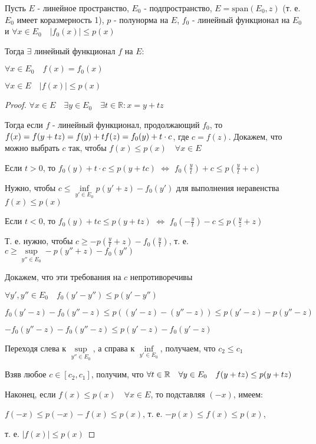 \documentclass[a4paper,12pt]{report}
\newcommand*{\hm}[1]{#1\nobreak\discretionary{}%
            {\hbox{$\mathsurround=0pt #1$}}{}}
\begin{document}
\begin{lem} Пусть $E$ - линейное пространство, $E_0$ - подпространство, $E=\mathrm{span}(E_0,z)$ (т. е. $E_0$ имеет коразмерность 1), $p$ - полунорма на $E$, $f_0$ - линейный функционал на $E_0$ и $\forall x\in E_0\quad|f_0(x)|\le p(x)$

Тогда $\exists$ линейный функционал $f$ на $E\colon$

$\forall x\in E_0\quad f(x)=f_0(x)$

$\forall x\in E\quad|f(x)|\le p(x)$
\end{lem}
\begin{proof} $\forall x\in E\quad\exists y\in E_0\quad\exists t\in\mathbb R\colon x=y+tz$

Тогда если $f$ - линейный функционал, продолжающий $f_0$, то $f(x)\hm=f(y+tz)=f(y)+tf(z)=f_0(y)+t\cdot c$, где $c=f(z)$. Докажем, что можно выбрать $c$ так, чтобы $f(x)\le p(x)\quad\forall x\in E$

Если $t>0$, то $f_0(y)+t\cdot c\le p(y+tc)$ $\Leftrightarrow$ $f_0(\frac{y}{t})+c\le p(\frac{y}{t}+c)$

Нужно, чтобы $c\le\inf\limits_{y'\in E_0}p(y'+z)-f_0(y')$ для выполнения неравенства $f(x)\le p(x)$

Если $t<0$, то $f_0(y)+tc\le p(y+tz)$ $\Leftrightarrow$ $f_0(-\frac{y}{t})-c\le p(\frac{y}{z}+z)$

Т. е. нужно, чтобы $c\ge-p(\frac{y}{t}+z)-f_0(\frac{y}{t})$, т. е. $c\ge\sup\limits_{y''\in E_0}-p(y''+z)-f_0(y'')$

Докажем, что эти требования на $c$ непротиворечивы

$\forall y',y''\in E_0\quad f_0(y'-y'')\le p(y'-y'')$

$f_0(y'-z)-f_0(y''-z)\le p((y'-z)-(y''-z))\le p(y'-z)-p(y''-z)$

$-f_0(y''-z)-f_0(y''-z)\le p(y'-z)-f_0(y'-z)$

Переходя слева к $\sup\limits_{y''\in E_0}$, а справа к $\inf\limits_{y'\in E_0}$, получаем, что $c_2\le c_1$

Взяв любое $c\in[c_2,c_1]$, получим, что $\forall t\in\mathbb R\quad\forall y\in E_0\quad f(y+tz)\hm\le p(y+tz)$

Наконец, если $f(x)\le p(x)\quad\forall x\in E$, то подставляя $(-x)$, имеем:

$f(-x)\le p(-x)-f(x)\le p(x)$, т. е. $-p(x)\le f(x)\le p(x)$,

 т. е. $|f(x)|\le p(x)$
\end{proof}
 
\end{document}
